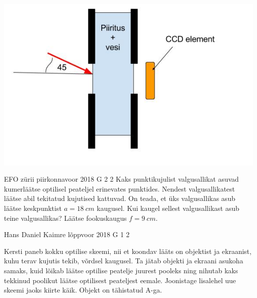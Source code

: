 \documentclass[11pt, twoside]{article}
\begin{document}
{{\begin{center}
	\vspace{-0pt}
	\includegraphics[width=0.5\linewidth]{2017-v2g-04-Piiritusetehas.jpg}
	\vspace{-10pt}
\end{center}
\fi
}

{EFO zürii} %
{piirkonnavoor} %
{2018} %
{G 2} %
{2} %
{
\ifStatement
Kaks punktikujulist valgusallikat asuvad kumerläätse optilisel peateljel erinevates punktides. Nendest valgusallikatest läätse abil tekitatud kujutised kattuvad. On teada, et üks valgusallikas asub läätse keskpunktist $a=\SI{18}{cm}$ kaugusel. Kui kaugel sellest valgusallikast asub teine valgusallikas? Läätse fookuskaugus $f=\SI{9}{cm}$. 
\fi
}

{Hans Daniel Kaimre} %
{lõppvoor} %
{2018} %
{G 1} %
{2} %
{
\ifStatement
Kersti paneb kokku optilise skeemi, nii et koondav lääts on objektist ja ekraanist, kuhu terav kujutis tekib, võrdsel kaugusel. Ta jätab objekti ja ekraani asukoha samaks, kuid lõikab läätse optilise peatelje juurest pooleks ning nihutab kaks tekkinud poolikut läätse optilisest peateljest eemale. Joonistage  lisalehel uue skeemi jaoks kiirte käik. Objekt on tähistatud A-ga.
\begin{center}
\end{center}}}
\end{document}
